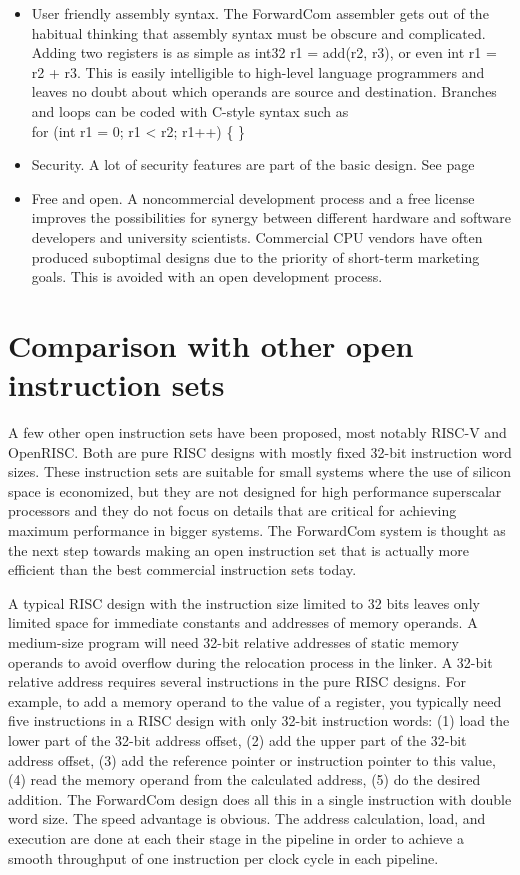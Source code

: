 \documentclass[forwardcom.tex]{subfiles}
\begin{document}
\begin{itemize}
\item User friendly assembly syntax. The ForwardCom assembler gets out of the habitual thinking that assembly syntax must be obscure and complicated. Adding two registers is as simple as {\ttfamily int32 r1 = add(r2, r3)}, or even {\ttfamily int r1 = r2 + r3}. This is easily intelligible to high-level language programmers and leaves no doubt about which operands are source and destination. 
Branches and loops can be coded with C-style syntax such as \\
{\ttfamily for (int r1 = 0; r1 < r2; r1++) \{  \} }

\item Security. A lot of security features are part of the basic design. 
See page \pageref{securityFeatures}

\item Free and open. A noncommercial development process and a free license improves the possibilities for synergy between different hardware and software developers and university scientists. Commercial CPU vendors have often produced suboptimal designs due to the priority of short-term marketing goals. This is avoided with an open development process.

\end{itemize}
\vv


\section{Comparison with other open instruction sets}
A few other open instruction sets have been proposed, most notably RISC-V and OpenRISC. Both are pure RISC designs with mostly fixed 32-bit instruction word sizes. These instruction sets are suitable for small systems where the use of silicon space is economized, but they are not designed for high performance superscalar processors and they do not focus on details that are critical for achieving maximum performance in bigger systems. The ForwardCom system is thought as the next step towards making an open instruction set that is actually more efficient than the best commercial instruction sets today.
\vv

A typical RISC design with the instruction size limited to 32 bits leaves only limited space for immediate constants and addresses of memory operands. A medium-size program will need 32-bit relative addresses of static memory operands to avoid overflow during the relocation process in the linker. A 32-bit relative address requires several instructions in the pure RISC designs. For example, to add a memory operand to the value of a register, you typically need five instructions in a RISC design with only 32-bit instruction words: (1) load the lower part of the 32-bit address offset, (2) add the upper part of the 32-bit address offset, (3) add the reference pointer or instruction pointer to this value, (4) read the memory operand from the calculated address, (5) do the desired addition. The ForwardCom design does all this in a single instruction with double word size. The speed advantage is obvious. The address calculation, load, and execution are done at each their stage in the pipeline in order to achieve a smooth throughput of one instruction per clock cycle in each pipeline.
\vv
\end{document}
